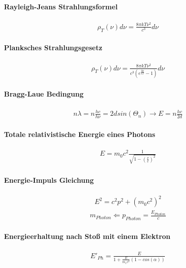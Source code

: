\documentclass[10pt,a4paper]{article}
\begin{document}
\paragraph{Rayleigh-Jeans Strahlungsformel}$\,$ \\
\begin{align}
\rho_T(\nu)d\nu=\frac{8\pi k T \nu^2}{c^3}d\nu
\end{align}
\paragraph{Planksches Strahlungsgesetz}$\,$ \\
\begin{align}
\rho_T(\nu)d\nu=\frac{8\pi k T \nu^2}{c^3(e^{\frac{h\nu}{kT}}-1)}d\nu
\end{align}
\paragraph{Bragg-Laue Bedingung}$\,$ \\
\begin{align}
n\lambda = n \frac{hc}{h\nu} = 2d sin(\Theta_n) \longrightarrow E = n \frac{hc}{2d}
\end{align}
\paragraph{Totale relativistische Energie eines Photons}$\,$ \\
\begin{align}
E=m_0 c^2 \frac{1}{\sqrt{1-(\frac{v}{c})^2}}
\end{align}
\paragraph{Energie-Impuls Gleichung}$\,$ \\
\begin{align}
E^2=c^2 p^2+(m_0c^2)^2
\end{align}
\begin{align}
m_{Photon} \Leftarrow p_{Photon} = \frac{E_{Photon}}{c}
\end{align}
\paragraph{Energieerhaltung nach Stoß mit einem Elektron}$\,$ \\
\begin{align}
E'_{Ph}=\frac{E}{1+\frac{E}{m_e c^2}(1-cos(\alpha))}
\end{align}
\end{document}
